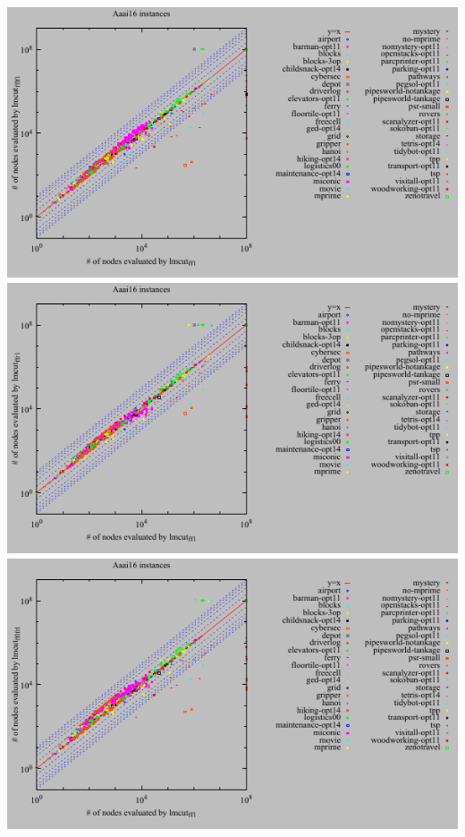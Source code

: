 \includegraphics{tables/aaai16-evaluated-lmcut_ff-lmcut_fflf.pdf}
\linebreak
\includegraphics{tables/aaai16-evaluated-lmcut_ff-lmcut_ffr.pdf}
\linebreak
\includegraphics{tables/aaai16-evaluated-lmcut_ff-lmcut_fflfr.pdf}
\linebreak
